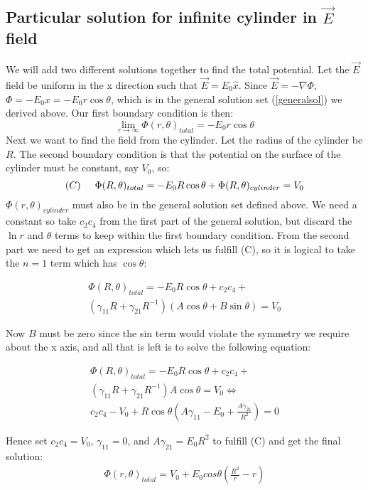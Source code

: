 \documentclass{article}
\begin{document}
\subsection{Particular solution for infinite cylinder in $\vec{E}$ field}
We will add two different solutions together to find the total potential. Let the $\vec{E}$ field be uniform in the x direction
such that $\vec{E} = E_0 \hat{x}$. Since $\vec{E} = - \nabla \Phi$, $\Phi = -E_0 x = -E_0 r \cos\theta$, which is
in the general solution set (\ref{generalsol}) we derived above.
Our first
boundary condition is then:
\[ \lim_{r \rightarrow \infty} \Phi(r,\theta)_{total} = -E_0 r \cos\theta \]
Next we want to find the field from the cylinder. Let the radius of the cylinder be $R$.
The second boundary condition is that the potential on the surface of the cylinder must be constant,
say $V_0$, so:
\[ (C) \hspace{0.5cm} \Phi(R,\theta)_{total} = -E_0 R \cos\theta + \Phi(R,\theta)_{cylinder} = V_0 \]
$\Phi(r,\theta)_{cylinder}$ must also be in the general solution set defined above. We need a constant so take $c_2 c_4$ from the first
part of the general solution, but discard the
$\ln r$ and $\theta$ terms to keep within the first boundary condition.
From the second part we need to get an expression which lets us fulfill (C), so it is logical to take the $n = 1$ term which has $\cos\theta$:

\begin{gather*}
 \Phi(R,\theta)_{total} = -E_0 R \cos\theta +  c_2 c_4 + \\
(\gamma_{11} R + \gamma_{21} R^{-1}) (A\cos\theta + B \sin\theta) = V_0 
\end{gather*}

Now $B$ must be zero since the sin term would violate the symmetry we require about the x axis, and all that is left is to solve the following equation:

\begin{gather*}
 \Phi(R,\theta)_{total} = -E_0 R \cos\theta + c_2 c_4 + \\
(\gamma_{11} R + \gamma_{21} R^{-1}) A\cos\theta = V_0 \Leftrightarrow \\
 c_2 c_4 - V_0 + R \cos\theta \left( A\gamma_{11} - E_0 + \frac{A\gamma_{21}}{R^2} \right) = 0 
\end{gather*}

Hence set $c_2 c_4 = V_0$, $\gamma_{11} = 0$, and $A\gamma_{21} = E_0 R^2$ to fulfill (C) and get the final solution:
\begin{gather}
 \Phi(r,\theta)_{total} = V_0 + E_0 cos\theta \left( \frac{R^2}{r} - r \right)
 \label{analyticsol}
\end{gather}
	
\end{document}
